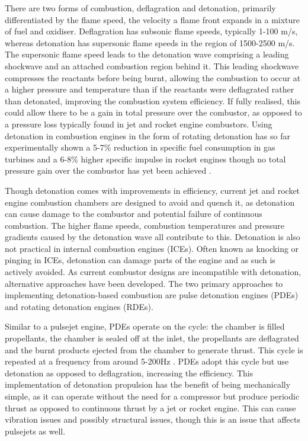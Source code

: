 \documentclass{article}
\begin{document}
There are two forms of combustion, deflagration and detonation, primarily differentiated by the flame speed, the velocity a flame front expands in a mixture of fuel and oxidiser. Deflagration has subsonic flame speeds, typically 1-100 m/s, whereas detonation has supersonic flame speeds in the region of 1500-2500 m/s. The supersonic flame speed leads to the detonation wave comprising a leading shockwave and an attached combustion region behind it. This leading shockwave compresses the reactants before being burnt, allowing the combustion to occur at a higher pressure and temperature than if the reactants were deflagrated rather than detonated, improving the combustion system efficiency\cite{Zeldovich2006}. If fully realised, this could allow there to be a gain in total pressure over the combustor, as opposed to a pressure loss typically found in jet and rocket engine combustors. Using detonation in combustion engines in the form of rotating detonation has so far experimentally shown a 5-7\% reduction in specific fuel consumption in gas turbines and a 6-8\% higher specific impulse in rocket engines though no total pressure gain over the combustor has yet been achieved \cite{1Anand2019}.
\par

Though detonation comes with improvements in efficiency, current jet and rocket engine combustion chambers are designed to avoid and quench it, as detonation can cause damage to the combustor and potential failure of continuous combustion. The higher flame speeds, combustion temperatures and pressure gradients caused by the detonation wave all contribute to this. Detonation is also not practical in internal combustion engines (ICEs). Often known as knocking or pinging in ICEs, detonation can damage parts of the engine and as such is actively avoided. As current combustor designs are incompatible with detonation, alternative approaches have been developed. The two primary approaches to implementing detonation-based combustion are pulse detonation engines (PDEs) and rotating detonation engines (RDEs).
\par

Similar to a pulsejet engine, PDEs operate on the cycle: the chamber is filled propellants, the chamber is sealed off at the inlet, the propellants are deflagrated and the burnt products ejected from the chamber to generate thrust. This cycle is repeated at a frequency from around 5-200Hz \cite{Pandey2016}. PDEs adopt this cycle but use detonation as opposed to deflagration, increasing the efficiency. This implementation of detonation propulsion has the benefit of being mechanically simple, as it can operate without the need for a compressor but produce periodic thrust as opposed to continuous thrust by a jet or rocket engine. This can cause vibration issues and possibly structural issues, though this is an issue that affects pulsejets as well.  
\par
\end{document}
